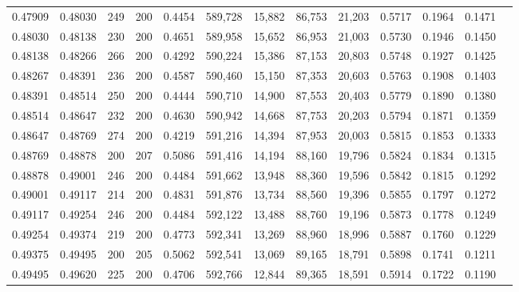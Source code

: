 \begin{tabular}{rrrrrrrrrrrrr}
0.47909 & 0.48030 &    249 & 200 &                                     0.4454 & 589,728 &  15,882 &  86,753 &  21,203 & 0.5717 & 0.1964 & 0.1471 \\
0.48030 & 0.48138 &    230 & 200 &                                     0.4651 & 589,958 &  15,652 &  86,953 &  21,003 & 0.5730 & 0.1946 & 0.1450 \\
0.48138 & 0.48266 &    266 & 200 &                                     0.4292 & 590,224 &  15,386 &  87,153 &  20,803 & 0.5748 & 0.1927 & 0.1425 \\
0.48267 & 0.48391 &    236 & 200 &                                     0.4587 & 590,460 &  15,150 &  87,353 &  20,603 & 0.5763 & 0.1908 & 0.1403 \\
0.48391 & 0.48514 &    250 & 200 &                                     0.4444 & 590,710 &  14,900 &  87,553 &  20,403 & 0.5779 & 0.1890 & 0.1380 \\
0.48514 & 0.48647 &    232 & 200 &                                     0.4630 & 590,942 &  14,668 &  87,753 &  20,203 & 0.5794 & 0.1871 & 0.1359 \\
0.48647 & 0.48769 &    274 & 200 &                                     0.4219 & 591,216 &  14,394 &  87,953 &  20,003 & 0.5815 & 0.1853 & 0.1333 \\
0.48769 & 0.48878 &    200 & 207 &                                     0.5086 & 591,416 &  14,194 &  88,160 &  19,796 & 0.5824 & 0.1834 & 0.1315 \\
0.48878 & 0.49001 &    246 & 200 &                                     0.4484 & 591,662 &  13,948 &  88,360 &  19,596 & 0.5842 & 0.1815 & 0.1292 \\
0.49001 & 0.49117 &    214 & 200 &                                     0.4831 & 591,876 &  13,734 &  88,560 &  19,396 & 0.5855 & 0.1797 & 0.1272 \\
0.49117 & 0.49254 &    246 & 200 &                                     0.4484 & 592,122 &  13,488 &  88,760 &  19,196 & 0.5873 & 0.1778 & 0.1249 \\
0.49254 & 0.49374 &    219 & 200 &                                     0.4773 & 592,341 &  13,269 &  88,960 &  18,996 & 0.5887 & 0.1760 & 0.1229 \\
0.49375 & 0.49495 &    200 & 205 &                                     0.5062 & 592,541 &  13,069 &  89,165 &  18,791 & 0.5898 & 0.1741 & 0.1211 \\
0.49495 & 0.49620 &    225 & 200 &                                     0.4706 & 592,766 &  12,844 &  89,365 &  18,591 & 0.5914 & 0.1722 & 0.1190 \\

\end{tabular}
